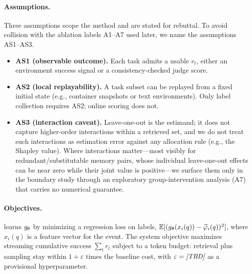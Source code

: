 \paragraph{Assumptions.}
Three assumptions scope the method and are stated for rebuttal. To avoid collision
with the ablation labels A1--A7 used later, we name the assumptions AS1--AS3.
\begin{itemize}
  \item \textbf{AS1 (observable outcome).} Each task admits a usable $r_t$, either
  an environment success signal or a consistency-checked judge score.
  \item \textbf{AS2 (local replayability).} A task subset can be replayed from a
  fixed initial state (e.g., container snapshots or text environments). Only
  \rit{} label collection requires AS2; \aca{} online scoring does not.
  \item \textbf{AS3 (interaction caveat).} Leave-one-out is the estimand; it does
  not capture higher-order interactions within a retrieved set, and we do not treat
  such interactions as estimation error against any allocation rule (e.g., the
  Shapley value). Where interactions matter---most visibly for
  redundant/substitutable memory pairs, whose individual leave-one-out effects can
  be near zero while their joint value is positive---we surface them only in the
  boundary study through an exploratory group-intervention analysis (A7) that
  carries no numerical guarantee.
\end{itemize}

\paragraph{Objectives.}
\aca{} learns $\attr$ by minimizing a regression loss on \rit{} labels,
$\E[(\attr(x_i(q)) - \phirit_i(q))^2]$, where $x_i(q)$ is a feature vector for the
event. The system objective maximizes streaming cumulative success $\sum_t r_t$
subject to a token budget: retrieval plus \rit{} sampling stay within
$1 + \varepsilon$ times the baseline cost, with
$\varepsilon = \tbd{RIT_BUDGET_EPSILON_PERCENT}$ as a provisional hyperparameter.

